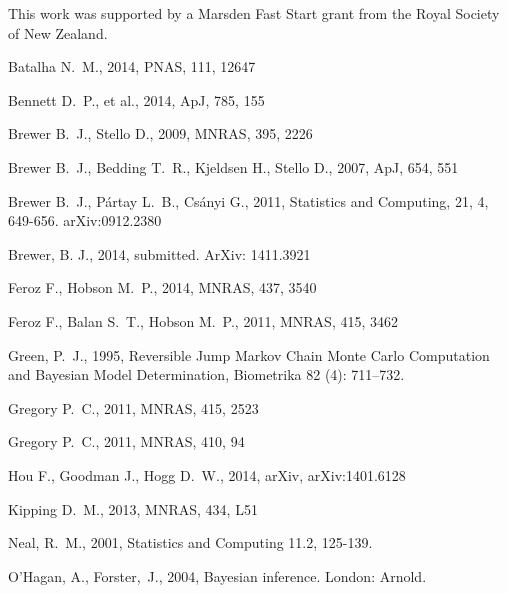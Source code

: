 \documentclass[useAMS,usenatbib]{mn2e}
\begin{document}
This work was supported by a Marsden Fast Start
grant from the Royal Society of
New Zealand.

\begin{thebibliography}{99}
Batalha N.~M., 2014, PNAS, 111, 12647 

 Bennett D.~P., et al., 2014, ApJ, 785, 155 

 Brewer B.~J., Stello D., 2009, MNRAS, 395, 2226 

Brewer B.~J., Bedding T.~R., Kjeldsen H., Stello D., 2007, ApJ, 654, 551 

 Brewer B.~J., P{\'a}rtay L.~B., Cs{\'a}nyi G., 2011,
Statistics and Computing, 21, 4, 649-656. arXiv:0912.2380

 Brewer, B. J., 2014,
submitted. ArXiv: 1411.3921

 Feroz F., Hobson M.~P., 2014, MNRAS, 437, 3540 

 Feroz F., Balan S.~T., Hobson M.~P., 2011, MNRAS, 415, 3462

Green, P.~J., 1995, Reversible Jump Markov Chain Monte Carlo Computation and Bayesian Model Determination, Biometrika 82 (4): 711–732.

Gregory P.~C., 2011, MNRAS, 415, 2523 

Gregory P.~C., 2011, MNRAS, 410, 94 

 Hou F., Goodman J., Hogg D.~W., 2014, arXiv, arXiv:1401.6128 

Kipping D.~M., 2013, MNRAS, 434, L51 

Neal, R.~M., 2001, Statistics and Computing 11.2, 125-139.

O'Hagan, A., Forster,~J., 2004, Bayesian inference. London: Arnold.


\end{thebibliography}
\end{document}
